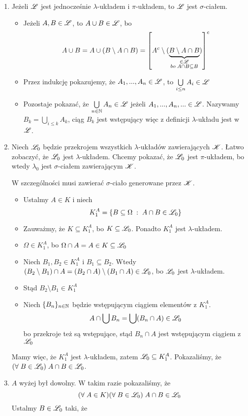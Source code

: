 \begin{enumerate}
    \item Jeżeli $\mathcal{L}$ jest jednocześnie $\lambda$-układem i $\pi$-układem, to $\mathcal{L}$ jest $\sigma$-ciałem.
        \begin{itemize}
            \item Jeżeli $A,B\in\mathcal{L}$, to $A\cup B\in\mathcal{L}$, bo
            $$A\cup B=
            A\cup(B\setminus A\cap B)=
            \left[A^c\setminus
            (\underbrace{B\setminus A\cap B}_{\substack{\in\mathcal{L}\\bo\;A\cap B\subseteq B}})\right]^c$$
            \item Przez indukcję pokazujemy, że $A_1,...,A_n\in\mathcal{L}$, to $\bigcup\limits_{i\leq n} A_i\in\mathcal{L}$
            \item Pozostaje pokazać, że $\bigcup\limits_{n\in\mathbb{N}}A_n\in\mathcal{L}$ jeżeli $A_1,...,A_n,...\in\mathcal{L}$. Nazywamy $B_k=\bigcup\limits_{i\leq k}A_k$, ciąg $B_k$ jest wstępujący więc z definicji $\lambda$-układu jest w $\mathcal{L}$.
        \end{itemize}
    \item Niech $\mathcal{L}_0$ będzie przekrojem wszystkich $\lambda$-układów zawierających $\mathcal{K}$. Łatwo zobaczyć, że $\mathcal{L}_0$ jest $\lambda$-układem. Chcemy pokazać, że $\mathcal{L}_0$ jest $\pi$-układem, bo wtedy $\lambda_0$ jest $\sigma$-ciałem zawierającym $\mathcal{K}$.
    
    W szczególności musi zawierać $\sigma$-ciało generowane przez $\mathcal{K}$.

        \begin{itemize}
            \item Ustalmy $A\in K$ i niech
            $$K^A_1=\{B\subseteq\Omega\;:\;A\cap B\in\mathcal{L}_0\}$$
            \item Zauważmy, że $K\subseteq K_1^A$, bo $K\subseteq\mathcal{L}_0$. Ponadto $K_1^A$ jest $\lambda$-układem.
            \item $\Omega\in K_1^A$, bo $\Omega\cap A=A\in K\subseteq\mathcal{L}_0$
            \item Niech $B_1,B_2\in K_1^A$ i $B_1\subseteq B_2$. Wtedy $(B_2\setminus B_1)\cap A=(B_2\cap A)\setminus(B_1\cap A)\in\mathcal{L}_0$, bo $\mathcal{L}_0$ jest $\lambda$-układem.
            \item Stąd $B_2\setminus B_1\in K_1^A$
            \item Niech $\{B_n\}_{n\in\mathbb{N}}$ będzie wstępującym ciągiem elementów z $K_1^A$.
            $$A\cap \bigcup B_n=\bigcup(B_n\cap A)\in\mathcal{L}_0$$
            bo przekroje też są wstępujące, stąd $B_n\cap A$ jest wstępującym ciągiem z $\mathcal{L}_0$ 
        \end{itemize}
    Mamy więc, że $K_1^A$ jest $\lambda$-układem, zatem $\mathcal{L}_0\subseteq K_1^A$. Pokazaliśmy, że $(\forall\;B\in\mathcal{L}_0)\;A\cap B\in\mathcal{L}_0$.
    \item $A$ wyżej był dowolny. W takim razie pokazaliśmy, że
    $$(\forall\;A\in K)(\forall\;B\in\mathcal{L}_0)\;A\cap B\in\mathcal{L}_0$$
    Ustalmy $B\in \mathcal{L}_0$ taki, że
\end{enumerate}

